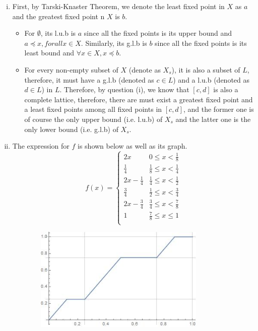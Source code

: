 \documentclass{article}[12pt]
\begin{document}
\begin{enumerate}[(i)]
\begin{itemize}
\end{itemize}
\item First, by Tarski-Knaster Theorem, we denote the least fixed point in $X$ as $a$ and the greatest fixed point n $X$ is $b$.
\begin{itemize}
\item For $\emptyset$, its l.u.b is $a$ since all the fixed points is its upper bound and $a \preceq x, forall x\in X$. Similarly, its g.l.b is $b$ since all the fixed points is its least bound and $\forall x\in X, x\preceq b$.
\item For every non-empty subset of $X$ (denote as $X_s$), it is also a subset of $L$, therefore, it must have a g.l.b (denoted as $c\in L$) and a l.u.b (denoted as $d\in L$) in $L$. Therefore, by question (i), we know that $[c,d]$ is also a complete lattice, therefore, there are must exist a greatest fixed point and a least fixed points among all fixed points in $[c,d]$, and the former one is of course the only upper bound (i.e. l.u.b) of $X_s$ and the latter one is the only lower bound (i.e. g.l.b) of $X_s$.
\end{itemize}
\item The expression for $f$ is shown below as well as its graph.
\begin{equation*}
f(x)=
\begin{cases}
2x& 0\leq x< \frac{1}{8}\\
\frac{1}{4}& \frac{1}{8}\leq x< \frac{1}{4}\\
2x-\frac{1}{4}&	\frac{1}{4}\leq x< \frac{1}{2}\\
\frac{3}{4}& \frac{1}{2}\leq x< \frac{3}{4}\\
2x-\frac{3}{4}&	\frac{3}{4}\leq x< \frac{7}{8}\\
1& \frac{7}{8}\leq x\leq 1\\
\end{cases}
\end{equation*}
\begin{figure}[H]
\centering
\includegraphics [width=9cm,height=5cm]{1_5.jpg}
\end{figure}
\end{enumerate}
\end{document}
